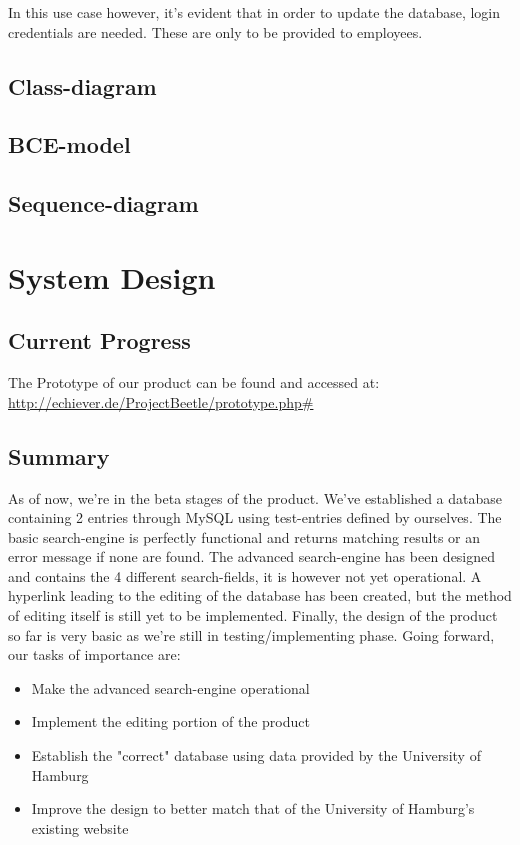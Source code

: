 \documentclass[12pt,a4paper]{article}
\begin{document}
In this use case however, it's evident that in order to update the database, login credentials are needed. These are only to be provided to employees.
\newpage

\subsection{Class-diagram}

\subsection{BCE-model}

\subsection{Sequence-diagram}

\newpage

\section{System Design}
\subsection{Current Progress}

The Prototype of our product can be found and accessed at: \url{http://echiever.de/ProjectBeetle/prototype.php#}
\subsection{Summary}

As of now, we're in the beta stages of the product. We've established a database containing 2 entries through MySQL using test-entries defined by ourselves. 
The basic search-engine is perfectly functional and returns matching results or an error message if none are found.
The advanced search-engine has been designed and contains the 4 different search-fields, it is however not yet operational.
A hyperlink leading to the editing of the database has been created, but the method of editing itself is still yet to be implemented.
Finally, the design of the product so far is very basic as we're still in testing/implementing phase.
Going forward, our tasks of importance are:
\begin{itemize}
\item Make the advanced search-engine operational
\item Implement the editing portion of the product
\item Establish the "correct" database using data provided by the University of Hamburg
\item Improve the design to better match that of the University of Hamburg's existing website
\end{itemize}
\end{document}
